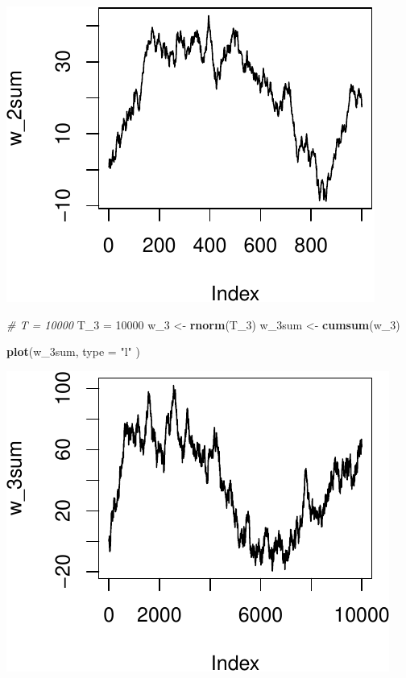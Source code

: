 \documentclass[11pt,]{article}
\newenvironment{Shaded}{\begin{snugshade}}{\end{snugshade}}
\newcommand{\KeywordTok}[1]{\textcolor[rgb]{0.13,0.29,0.53}{\textbf{#1}}}
\newcommand{\DataTypeTok}[1]{\textcolor[rgb]{0.13,0.29,0.53}{#1}}
\newcommand{\DecValTok}[1]{\textcolor[rgb]{0.00,0.00,0.81}{#1}}
\newcommand{\StringTok}[1]{\textcolor[rgb]{0.31,0.60,0.02}{#1}}
\newcommand{\CommentTok}[1]{\textcolor[rgb]{0.56,0.35,0.01}{\textit{#1}}}
\newcommand{\NormalTok}[1]{#1}
\begin{document}
\begin{center}\includegraphics{FMC_T4_PhD_Wiener_Process_files/figure-latex/wiener_process_mean_var-2} \end{center}

\begin{Shaded}
\begin{Highlighting}[]
\CommentTok{# T = 10000}
\NormalTok{T_}\DecValTok{3}\NormalTok{ =}\StringTok{ }\DecValTok{10000}
\NormalTok{w_}\DecValTok{3}\NormalTok{ <-}\StringTok{ }\KeywordTok{rnorm}\NormalTok{(T_}\DecValTok{3}\NormalTok{)}
\NormalTok{w_3sum <-}\StringTok{ }\KeywordTok{cumsum}\NormalTok{(w_}\DecValTok{3}\NormalTok{)}

\KeywordTok{plot}\NormalTok{(w_3sum,}
     \DataTypeTok{type =} \StringTok{"l"}
\NormalTok{     )}
\end{Highlighting}
\end{Shaded}

\begin{center}\includegraphics{FMC_T4_PhD_Wiener_Process_files/figure-latex/wiener_process_mean_var-3} \end{center}
\end{document}
